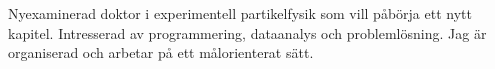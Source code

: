 

\begin{cvparagraph}

Nyexaminerad doktor i experimentell partikelfysik som vill p{\aa}b{\"o}rja ett nytt kapitel. %
Intresserad av programmering, dataanalys och problemlösning. 
Jag är organiserad och arbetar på ett målorienterat sätt. %
\end{cvparagraph}